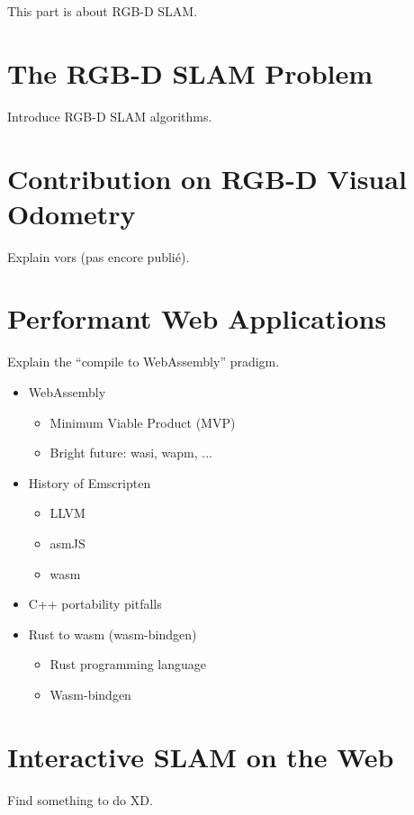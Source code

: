 This part is about RGB-D SLAM\@.

\chapter{The RGB-D SLAM Problem}%
\label{cha:the_rgb_d_slam_problem}

Introduce RGB-D SLAM algorithms.

\chapter{Contribution on RGB-D Visual Odometry}%
\label{cha:contribution_on_rgb_d_visual_odometry}

Explain vors (pas encore publié).

\chapter{Performant Web Applications}%
\label{cha:performant_web_applications}

Explain the ``compile to WebAssembly'' pradigm.

\begin{itemize}
	\item WebAssembly
	\begin{itemize}
		\item Minimum Viable Product (MVP)
		\item Bright future: wasi, wapm, ...
	\end{itemize}
	\item History of Emscripten
	\begin{itemize}
		\item LLVM
		\item asmJS
		\item wasm
	\end{itemize}
	\item C++ portability pitfalls
	\item Rust to wasm (wasm-bindgen)
	\begin{itemize}
		\item Rust programming language
		\item Wasm-bindgen
	\end{itemize}
\end{itemize}

\chapter{Interactive SLAM on the Web}%
\label{cha:interactive_slam_on_the_web}

Find something to do XD\@.
